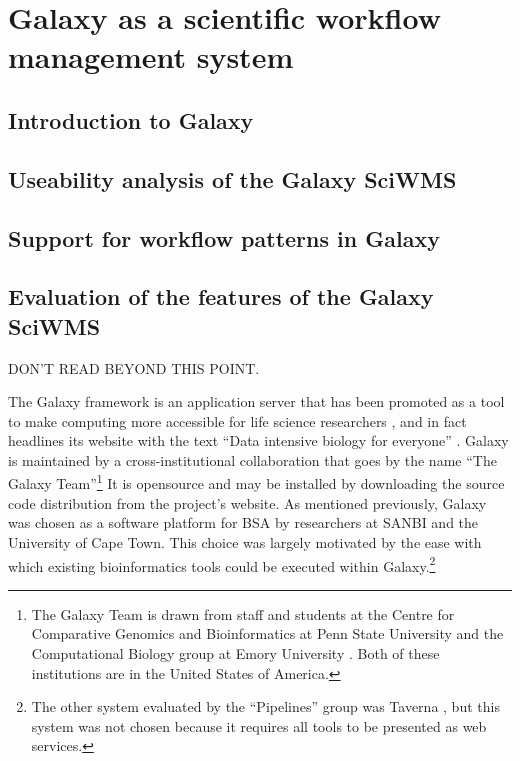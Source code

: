 \documentclass[a4paper,10pt]{scrreprt} \usepackage[utf8]{inputenc}
\begin{document}
\chapter{Galaxy as a scientific workflow management system}
\label{sec:galaxy_swms}

\section{Introduction to Galaxy}
\label{sec:galaxy_intro}

\section{Useability analysis of the Galaxy SciWMS}
\label{sec:galaxy_swms_useability}

\section{Support for workflow patterns in Galaxy}
\label{sec:galaxy_swms_patterns}

\section{Evaluation of the features of the Galaxy SciWMS}
\label{sec:galaxy_swms_features}

DON'T READ BEYOND THIS POINT.

The Galaxy framework is an application server that has been promoted as a tool to make computing more accessible for life science researchers \cite{goecks_galaxy:_2010}, and in fact headlines its website with the text ``Data intensive biology for everyone'' \cite{the_galaxy_team_galaxy_2012}. Galaxy is maintained by a cross-institutional collaboration that goes by the name ``The Galaxy Team''\footnote{The Galaxy Team is drawn from staff and students at the Centre for Comparative Genomics and Bioinformatics at Penn State University and the Computational Biology group at Emory University \cite{the_galaxy_team_galaxy_2012}. Both of these institutions are in the United States of America.} It is \gls{opensource} and may be installed by downloading the source code distribution from the project's website. As mentioned previously, Galaxy was chosen as a software platform for \gls{BSA} by researchers at SANBI and the University of Cape Town. This choice was largely motivated by the ease with which existing 
bioinformatics tools could be executed within Galaxy.\footnote{The other system evaluated by the ``Pipelines'' group was Taverna \cite{hull_taverna:_2006}, but this system was not chosen because it requires all tools to be presented as web services.}
\end{document}
